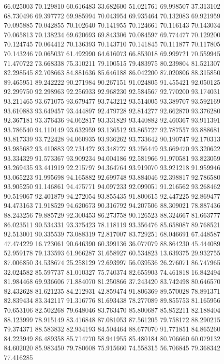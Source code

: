 66.025003
70.129810
60.616483
33.682600
51.021761
69.998507
37.313102
68.730496
69.397772
69.985994
70.043954
69.935464
70.132083
69.921959
70.095885
70.042855
70.102640
70.141955
70.124661
70.116143
70.143034
70.065813
70.138234
69.620693
69.843306
70.084597
69.774477
70.129200
70.124745
70.064412
70.136393
70.143710
70.141845
70.111877
70.117805
70.143246
70.065037
61.492990
64.616073
66.853018
69.999721
70.559945
71.470722
73.668338
75.310211
79.100515
79.483975
80.239804
81.521307
82.298545
82.708663
84.881636
85.646188
86.042200
87.020806
88.315850
89.465951
89.242222
90.271984
90.267151
91.024805
91.455421
92.050125
92.299750
92.298963
92.256933
92.968230
92.584567
92.770200
93.174031
93.211465
93.671075
93.679477
93.743212
93.514005
93.389707
93.592169
93.610883
93.649457
93.444897
92.479728
92.814277
92.662870
93.376280
92.367181
93.376436
94.062817
93.331829
93.440882
92.460367
93.911391
93.786540
94.110149
93.632959
93.136512
93.865727
92.787557
93.888681
93.817339
93.722428
94.060935
93.936262
93.733642
90.190747
92.170313
93.985682
93.410883
92.731427
93.348727
93.756449
93.669470
93.320622
93.334329
91.573367
93.909234
94.004186
92.581966
91.970581
93.823059
93.269435
93.441919
92.215797
94.364764
93.919070
93.921218
91.959946
93.065223
91.995698
94.165882
92.699748
93.884046
92.398817
92.786580
93.905250
91.146861
94.475771
94.097233
92.099051
91.216562
93.268462
90.519067
92.401879
94.272054
93.855435
91.800615
92.447225
92.869477
94.473163
71.918529
94.620673
90.316792
94.207506
88.309021
78.887436
88.243256
79.885729
92.300453
86.273758
90.126523
88.324667
81.663777
86.023511
90.534331
93.375423
78.118119
93.356476
85.658087
89.768521
92.513001
90.335539
73.088319
72.817007
83.729251
68.046691
67.448587
47.474229
16.723061
90.646390
60.399136
36.077079
88.864230
45.444089
52.959178
79.133593
61.966287
31.658927
60.534823
13.639375
29.932755
87.006850
34.538674
25.258129
72.693997
56.039536
26.276071
86.747965
32.024582
85.597737
81.010327
75.740374
82.655903
74.461818
16.842494
81.984468
69.936606
71.884070
81.250866
37.243420
83.742498
80.646570
82.432628
81.621235
84.212931
42.859474
91.806369
89.570028
78.891371
82.839434
83.342117
91.316776
81.693438
78.277089
89.855753
81.165956
70.653106
82.502268
79.648046
83.763470
85.800687
85.852211
82.188404
88.123999
78.915149
83.416848
87.081053
87.561205
79.758172
88.290215
79.374371
88.583832
82.934193
84.504464
88.677070
91.771851
84.865260
84.223949
86.489358
85.714770
58.941955
85.480184
80.706660
60.079132
84.602020
85.983450
79.780608
75.915660
74.558315
56.706845
79.368342
77.416285
